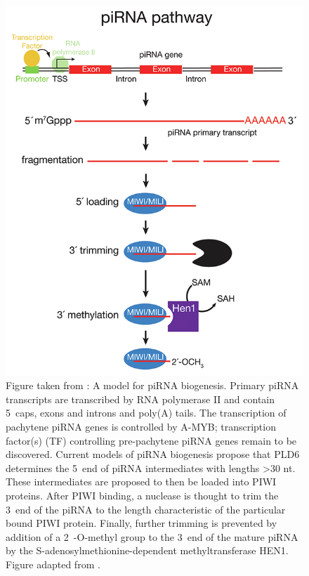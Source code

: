{    \begin{figure}\small %
     \centering 
     \includegraphics{Figures/Intro/mammalian_piRNA_pathway.png}
     \caption[A model for Mammalian piRNA biogenesis]
     {
       Figure taken from \citep{Li2013e}: A model for piRNA biogenesis. Primary piRNA transcripts are transcribed by RNA polymerase II and contain 5\textprime~caps, exons and introns and poly(A) tails. The transcription of pachytene piRNA genes is controlled by A-MYB; transcription factor(s) (TF) controlling pre-pachytene piRNA genes remain to be discovered. Current models of piRNA biogenesis propose that PLD6 determines the 5\textprime~end of piRNA intermediates with lengths >30 nt. These intermediates are proposed to then be loaded into PIWI proteins. After PIWI binding, a nuclease is thought to trim the 3\textprime~end of the piRNA to the length characteristic of the particular bound PIWI protein. Finally, further trimming is prevented by addition of a 2\textprime~-O-methyl group to the 3\textprime~end of the mature piRNA by the S-adenosylmethionine-dependent methyltransferase HEN1. Figure adapted from \citep{Li2013}.
       }
     \label{Intro:fig:Mammalian piRNA BioGensis}
     \end{figure}

}
